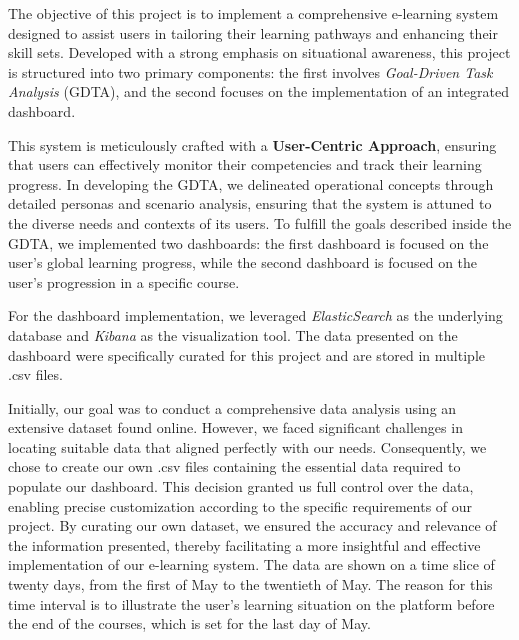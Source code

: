 The objective of this project is to implement a comprehensive e-learning system designed to assist users 
in tailoring their learning pathways and enhancing their skill sets. Developed with a strong emphasis on 
situational awareness, this project is structured into two primary components: the first involves 
\textit{Goal-Driven Task Analysis} (GDTA), and the second focuses on the implementation of an integrated dashboard.

This system is meticulously crafted with a \textbf{User-Centric Approach}, ensuring that users can effectively 
monitor their competencies and track their learning progress. In developing the GDTA, we delineated operational 
concepts through detailed personas and scenario analysis, ensuring that the system is attuned to the diverse needs 
and contexts of its users. To fulfill the goals described inside the GDTA, we implemented two dashboards: the first
dashboard is focused on the user's global learning progress, while the second dashboard is focused on the user's
progression in a specific course.

For the dashboard implementation, we leveraged \textit{ElasticSearch} as the underlying database and \textit{Kibana} 
as the visualization tool. The data presented on the dashboard were specifically curated for this project and are 
stored in multiple .csv files. 

Initially, our goal was to conduct a comprehensive data analysis using an extensive dataset found online. However, 
we faced significant challenges in locating suitable data that aligned perfectly with our needs. Consequently, we 
chose to create our own .csv files containing the essential data required to populate our dashboard. 
This decision granted us full control over the data, enabling precise customization according to the specific 
requirements of our project. By curating our own dataset, we ensured the accuracy and relevance of the information 
presented, thereby facilitating a more insightful and effective implementation of our e-learning system. The data 
are shown on a time slice of twenty days, from the first of May to the twentieth of May. The reason for 
this time interval is to illustrate the user's learning situation on the platform before the end of the courses,
which is set for the last day of May. 

